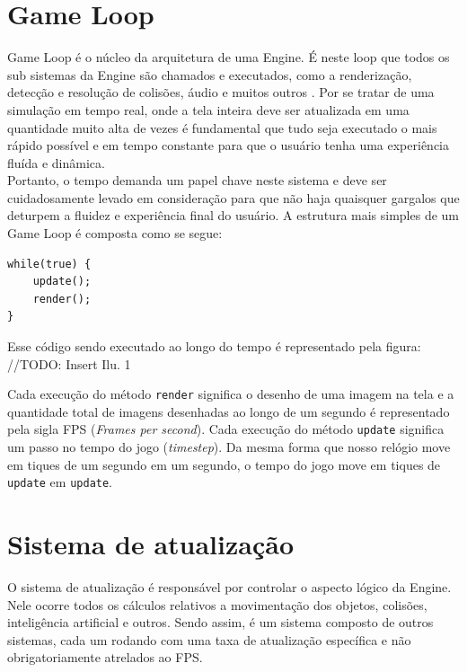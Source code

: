 \documentclass[12pt, 
openright, 
oneside, 
a4paper,    
brazil]{facom-ufu-abntex2}
\begin{document}
\section{Game Loop}
Game Loop é o núcleo da arquitetura de uma Engine. É neste loop que todos os sub sistemas da Engine são chamados e  executados, como a renderização, detecção e resolução de colisões, áudio e muitos outros \cite{GameEngineArchitecture}. Por se tratar de uma simulação em tempo real, onde a tela inteira deve ser atualizada em uma quantidade muito alta de vezes é fundamental que tudo seja executado o mais rápido possível e em tempo constante para que o usuário tenha uma experiência fluída e dinâmica.\\
Portanto, o tempo demanda um papel chave neste sistema e deve ser cuidadosamente levado em consideração para que não haja quaisquer gargalos que deturpem a fluidez e experiência final do usuário. A estrutura mais simples de um Game Loop é composta como se segue:\\

\begin{lstlisting}[caption=Estrutura básica do Game Loop]
while(true) {
	update();
	render();
}
\end{lstlisting}
Esse código sendo executado ao longo do tempo é representado pela figura:
\\//TODO: Insert Ilu. 1

Cada execução do método \texttt{render} significa o desenho de uma imagem na tela e a quantidade total de imagens desenhadas ao longo de um segundo é representado pela sigla FPS (\textit{Frames per second}). Cada execução do método \texttt{update} significa um passo no tempo do jogo (\textit{timestep}). Da mesma forma que nosso relógio move em tiques de um segundo em um segundo, o tempo do jogo move em tiques de \texttt{update} em \texttt{update}.


\section{Sistema de atualização}
O sistema de atualização é responsável por controlar o aspecto lógico da Engine. Nele ocorre todos os cálculos relativos a movimentação dos objetos, colisões, inteligência artificial e outros. Sendo assim, é um sistema composto de outros sistemas, cada um rodando com uma taxa de atualização específica e não obrigatoriamente atrelados ao FPS.
\end{document}

